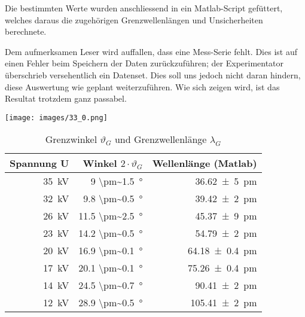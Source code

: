 Die bestimmten  Werte wurden  anschliessend in ein  Matlab-Script gef\"uttert,
welches  daraus  die   zugeh\"origen  Grenzwellenl\"angen  und  Unsicherheiten
berechnete.

Dem  aufmerksamen  Leser  wird  auffallen, dass  eine  Mess-Serie  fehlt. Dies
ist  auf  einen  Fehler  beim  Speichern  der  Daten  zur\"uckzuf\"uhren;  der
Experimentator \"uberschrieb versehentlich ein  Datenset. Dies soll uns jedoch
nicht daran  hindern, diese Auswertung wie  geplant weiterzuf\"uhren. Wie sich
zeigen wird, ist das Resultat trotzdem ganz passabel.

\begin{sidewaysfigure}[h!]
    \centering
    \texttt{[image: images/33\_0.png]}
    \caption{%
        Schematische    Darstellung    der   Bestimmung    der    Grenzwinkel.
        \textbf{Beachte:} Die     hier     eingezeichneten    Geraden     sind
        nicht     diejenigen,     welche     wirklich    zu     den     Werten
        aus     Tabelle     \ref{tab:resultsPlanckManualFit}     auf     Seite
        \pageref{tab:resultsPlanckManualFit}  gef\"uhrt haben. Dazu  ist diese
        Grafik viel  zu grob. Es  wurde pro  Spannung jeweils  ein Scatterplot
        ausgewertet, um  die zugeh\"origen  Grenzwinkel zu  bestimmen. Da dies
        jedoch  unverh\"altnism\"assig  viel  Platz  ben\"otigt  f\"ur  diesen
        Bericht, ist das Vorgehen schematisch hier dargestellt.
    }
    \label{fig:planckDemo}
\end{sidewaysfigure}

\begin{table}[h!]
    \centering
    \small
    \caption{Grenzwinkel $\vartheta_G$ und Grenzwellenl\"ange $\lambda_G$}
    \label{tab:resultsPlanckManualFit}
    \begin{tabular}{rrr}
        \toprule
        Spannung U          & Winkel $2 \cdot \vartheta_G$      & Wellenl\"ange (Matlab) \\
        \midrule
        \SI{35}{\kilo\volt} &       \SI{9     \pm~1.5}{\degree} & \SI{ 36.62 \pm 5  }{\pico\meter} \\
        \SI{32}{\kilo\volt} &       \SI{9.8   \pm~0.5}{\degree} & \SI{ 39.42 \pm 2  }{\pico\meter} \\
        \SI{26}{\kilo\volt} &       \SI{11.5  \pm~2.5}{\degree} & \SI{ 45.37 \pm 9  }{\pico\meter} \\
        \SI{23}{\kilo\volt} &       \SI{14.2  \pm~0.5}{\degree} & \SI{ 54.79 \pm 2  }{\pico\meter} \\
        \SI{20}{\kilo\volt} &       \SI{16.9  \pm~0.1}{\degree} & \SI{ 64.18 \pm 0.4}{\pico\meter} \\
        \SI{17}{\kilo\volt} &       \SI{20.1  \pm~0.1}{\degree} & \SI{ 75.26 \pm 0.4}{\pico\meter} \\
        \SI{14}{\kilo\volt} &       \SI{24.5  \pm~0.7}{\degree} & \SI{ 90.41 \pm 2  }{\pico\meter} \\
        \SI{12}{\kilo\volt} &       \SI{28.9  \pm~0.5}{\degree} & \SI{105.41 \pm 2  }{\pico\meter} \\
        \bottomrule
    \end{tabular}
\end{table}

